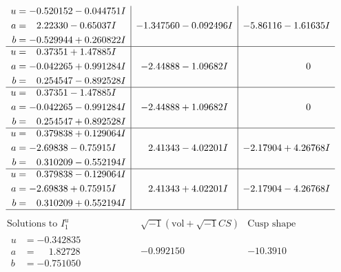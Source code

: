 \documentclass[1p]{elsarticle_modified}
\theoremstyle{definition}
\newcommand{\I}{\sqrt{-1}}
\begin{document}
$$\begin{array}{c|c|c}
\begin{aligned}
u &= -0.520152 - 0.044751 I \\
a &= \phantom{-}2.22330 - 0.65037 I \\
b &= -0.529944 + 0.260822 I\end{aligned}
 & -1.347560 - 0.092496 I & -5.86116 - 1.61635 I \\ \hline\begin{aligned}
u &= \phantom{-}0.37351 + 1.47885 I \\
a &= -0.042265 + 0.991284 I \\
b &= \phantom{-}0.254547 - 0.892528 I\end{aligned}
 & -2.44888 - 1.09682 I & \phantom{-0.000000 } 0 \\ \hline\begin{aligned}
u &= \phantom{-}0.37351 - 1.47885 I \\
a &= -0.042265 - 0.991284 I \\
b &= \phantom{-}0.254547 + 0.892528 I\end{aligned}
 & -2.44888 + 1.09682 I & \phantom{-0.000000 } 0 \\ \hline\begin{aligned}
u &= \phantom{-}0.379838 + 0.129064 I \\
a &= -2.69838 - 0.75915 I \\
b &= \phantom{-}0.310209 - 0.552194 I\end{aligned}
 & \phantom{-}2.41343 - 4.02201 I & -2.17904 + 4.26768 I \\ \hline\begin{aligned}
u &= \phantom{-}0.379838 - 0.129064 I \\
a &= -2.69838 + 0.75915 I \\
b &= \phantom{-}0.310209 + 0.552194 I\end{aligned}
 & \phantom{-}2.41343 + 4.02201 I & -2.17904 - 4.26768 I\\
 \hline 
 \end{array}$$\newpage$$\begin{array}{c|c|c}  
\text{Solutions to }I^u_{1}& \I (\text{vol} + \sqrt{-1}CS) & \text{Cusp shape}\\
 \hline 
\begin{aligned}
u &= -0.342835\phantom{ +0.000000I} \\
a &= \phantom{-}1.82728\phantom{ +0.000000I} \\
b &= -0.751050\phantom{ +0.000000I}\end{aligned}
 & -0.992150\phantom{ +0.000000I} & -10.3910\phantom{ +0.000000I} \\ \hline\begin{aligned}

\end{aligned}
\end{array}$$
\end{document}
